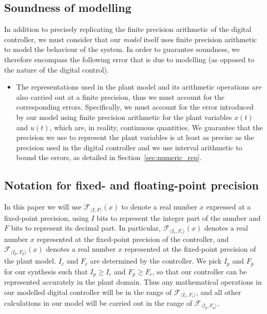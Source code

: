 \subsection{Soundness of modelling}

In addition to precisely replicating the finite precision arithmetic of the digital controller, we must consider that our \emph{model} itself uses finite precision arithmetic to model the behaviour of the system. In order to guarantee soundness, we therefore encompass the following error that is due to modelling (as opposed to the nature of the digital control).  
\begin{itemize} 
\item
The representations used in the plant model and its arithmetic operations are also carried out at a finite precision, 
thus we must account for the corresponding errors.  
Specifically, we must account for the error introduced by our model using finite precision arithmetic for the plant variables $x(t)$ and $u(t)$, which are, in reality, continuous quantities. 
We guarantee that the precision we use to represent the plant variables is at least as precise as the precision used in the digital controller and we use interval arithmetic to bound the errors, as detailed in Section~\ref{sec:numeric_rep}. 
\end{itemize}


\subsection{Notation for fixed- and floating-point precision}  

In this paper we will use $\mathcal{F}_{\langle I,F \rangle}(x)$ to denote a real number $x$ expressed at a fixed-point precision, 
using $I$ bits to represent the integer part of the number and $F$ bits to represent its decimal part.  
In particular, $\mathcal{F}_{\langle I_c,F_c \rangle}(x)$ denotes a real number $x$ represented at the fixed-point precision of the controller, 
and $\mathcal{F}_{\langle I_p,F_p \rangle}(x)$ denotes a real number $x$
represented at the fixed-point precision of the plant model. 
$I_c$ and $F_c$ are determined by the controller.  We pick $I_p$ and $F_p$ for our synthesis
such that $I_p \geq I_c$ and $\allowbreak F_p \geq F_c$, so that our controller 
can be represented accurately in the plant domain.    
Thus any mathematical operations in our modelled digital controller will be in the
range of $\mathcal{F}_{\langle I_c,F_c \rangle}$, and all other calculations
in our model will be carried out in the range of $\mathcal{F}_{\langle
I_p,F_p \rangle}$.  

